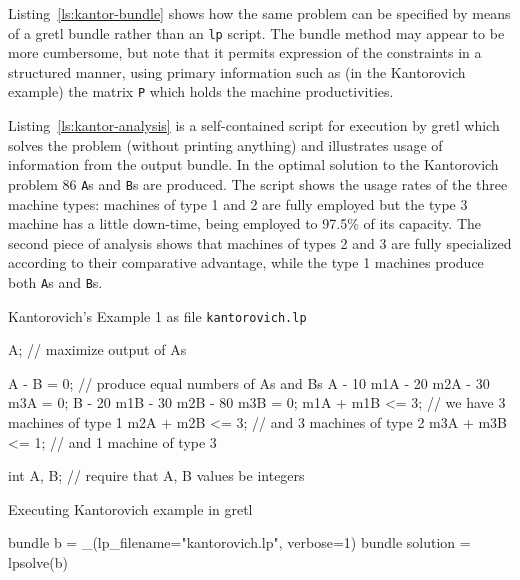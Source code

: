 \documentclass{article}
\begin{document}
Listing~\ref{ls:kantor-bundle} shows how the same problem can be
specified by means of a gretl bundle rather than an \texttt{lp}
script. The bundle method may appear to be more cumbersome, but note
that it permits expression of the constraints in a structured manner,
using primary information such as (in the Kantorovich example) the
matrix \texttt{P} which holds the machine productivities.

Listing~\ref{ls:kantor-analysis} is a self-contained script for
execution by gretl which solves the problem (without printing
anything) and illustrates usage of information from the output
bundle. In the optimal solution to the Kantorovich problem 86
\texttt{A}s and \texttt{B}s are produced. The script shows the usage
rates of the three machine types: machines of type 1 and 2 are fully
employed but the type 3 machine has a little down-time, being employed
to 97.5\% of its capacity. The second piece of analysis shows that
machines of types 2 and 3 are fully specialized according to their
comparative advantage, while the type 1 machines produce both
\texttt{A}s and \texttt{B}s.

\clearpage



\begin{script}[htbp]
  \caption{Kantorovich's Example 1 as file \texttt{kantorovich.lp}}
  \label{ls:kantor-lp}
\begin{scode}
A; // maximize output of As

A - B = 0; // produce equal numbers of As and Bs
A - 10 m1A - 20 m2A - 30 m3A = 0;
B - 20 m1B - 30 m2B - 80 m3B = 0;
m1A + m1B <= 3; // we have 3 machines of type 1
m2A + m2B <= 3; // and 3 machines of type 2
m3A + m3B <= 1; // and 1 machine of type 3

int A, B; // require that A, B values be integers
\end{scode}
\end{script}

\begin{script}[htbp]
  \caption{Executing Kantorovich example in gretl}
  \label{ls:kantor-inp}
\begin{scode}
bundle b = _(lp_filename="kantorovich.lp", verbose=1)
bundle solution = lpsolve(b)
\end{scode}
\end{script}
\end{document}
